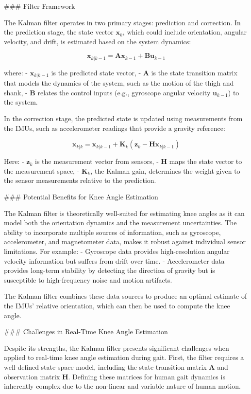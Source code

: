 ### Filter Framework

The Kalman filter operates in two primary stages: prediction and correction. In the prediction stage, the state vector \( \mathbf{x}_k \), which could include orientation, angular velocity, and drift, is estimated based on the system dynamics:

\[
\mathbf{x}_{k|k-1} = \mathbf{A} \mathbf{x}_{k-1} + \mathbf{B} \mathbf{u}_{k-1}
\]

where:
- \( \mathbf{x}_{k|k-1} \) is the predicted state vector,
- \( \mathbf{A} \) is the state transition matrix that models the dynamics of the system, such as the motion of the thigh and shank,
- \( \mathbf{B} \) relates the control inputs (e.g., gyroscope angular velocity \( \mathbf{u}_{k-1} \)) to the system.

In the correction stage, the predicted state is updated using measurements from the IMUs, such as accelerometer readings that provide a gravity reference:

\[
\mathbf{x}_{k|k} = \mathbf{x}_{k|k-1} + \mathbf{K}_k \left( \mathbf{z}_k - \mathbf{H} \mathbf{x}_{k|k-1} \right)
\]

Here:
- \( \mathbf{z}_k \) is the measurement vector from sensors,
- \( \mathbf{H} \) maps the state vector to the measurement space,
- \( \mathbf{K}_k \), the Kalman gain, determines the weight given to the sensor measurements relative to the prediction.

### Potential Benefits for Knee Angle Estimation

The Kalman filter is theoretically well-suited for estimating knee angles as it can model both the orientation dynamics and the measurement uncertainties. The ability to incorporate multiple sources of information, such as gyroscope, accelerometer, and magnetometer data, makes it robust against individual sensor limitations. For example:
- Gyroscope data provides high-resolution angular velocity information but suffers from drift over time.
- Accelerometer data provides long-term stability by detecting the direction of gravity but is susceptible to high-frequency noise and motion artifacts.

The Kalman filter combines these data sources to produce an optimal estimate of the IMUs' relative orientation, which can then be used to compute the knee angle.

### Challenges in Real-Time Knee Angle Estimation

Despite its strengths, the Kalman filter presents significant challenges when applied to real-time knee angle estimation during gait. First, the filter requires a well-defined state-space model, including the state transition matrix \( \mathbf{A} \) and observation matrix \( \mathbf{H} \). Defining these matrices for human gait dynamics is inherently complex due to the non-linear and variable nature of human motion.

